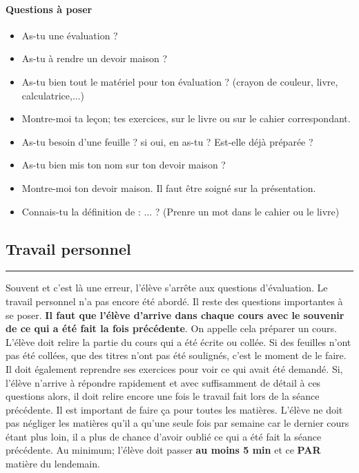 \documentclass[11pt]{article}
\newcommand{\horrule}[1]{\rule{\linewidth}{#1}} %
\begin{document}
\begin{multicols}{2}

\paragraph{Questions à poser}

\begin{itemize}
  \item As-tu une évaluation ? 
  \item As-tu à rendre un devoir maison ?
  \item As-tu bien tout le matériel pour ton évaluation ? (crayon de couleur, livre, calculatrice,...)
  \item Montre-moi ta leçon; tes exercices, sur le livre ou sur le cahier correspondant. 
  \item As-tu besoin d'une feuille ? si oui, en as-tu ? Est-elle déjà préparée ? 
  \item As-tu bien mis ton nom sur ton devoir maison ?
  \item Montre-moi ton devoir maison. Il faut être soigné sur la présentation.
  \item Connais-tu la définition de : ... ? (Prenre un mot dans le cahier ou le livre)
 \end{itemize} 
\end{multicols}

\subsection*{Travail personnel}
\horrule{1px}

Souvent et c'est là une erreur, l'élève s'arrête aux questions d'évaluation. Le travail personnel n'a pas encore été abordé. Il reste des questions importantes à se poser. \textbf{Il faut que l'élève d'arrive dans chaque cours avec le souvenir de ce qui a été fait la fois précédente}. On appelle cela préparer un cours. L'élève doit relire la partie du cours qui a été écrite ou collée. Si des feuilles n'ont pas été collées, que des titres n'ont pas été soulignés, c'est le moment de le faire. Il doit également reprendre ses exercices pour voir ce qui avait été demandé. Si, l'élève n'arrive à répondre rapidement et avec suffisamment de détail à ces questions alors, il doit relire encore une fois le travail fait lors de la séance précédente. Il est important de faire ça pour toutes les matières. L'élève ne doit pas négliger les matières qu'il a qu'une seule fois par semaine car le dernier cours étant plus loin, il a plus de chance d'avoir oublié ce qui a été fait la séance précédente. Au minimum; l'élève doit passer \textbf{au moins 5 min} et ce \textbf{PAR} matière du lendemain.
\end{document}
